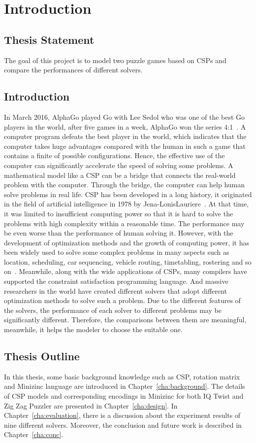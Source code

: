 \chapter{Introduction}
\label{cha:intro}
\section{Thesis Statement}
\label{sec:problemstatement}
The goal of this project is to model two puzzle games based on CSPs and compare the performances of different solvers.
\section{Introduction}
\label{sec:introduction}
In March 2016, AlphaGo played Go with Lee Sedol who was one of the best Go players in the world, after five games in a week, AlphaGo won the series 4:1~\cite{r26}. A computer program defeats the best player in the world, which indicates that the computer takes huge advantages compared with the human in such a game that contains a finite of possible configurations. Hence, the effective use of the computer can significantly accelerate the speed of solving some problems. A mathematical model like a CSP can be a bridge that connects the real-world problem with the computer. Through the bridge, the computer can help human solve problems in real life. CSP has been developed in a long history, it originated in the field of artificial intelligence in 1978 by Jena-LonisLauriere~\cite{r27}. At that time, it was limited to insufficient computing power so that it is hard to solve the problems with high complexity within a reasonable time. The performance may be even worse than the performance of human solving it. However, with the development of optimization methods and the growth of computing power, it has been widely used to solve some complex problems in many aspects such as location, scheduling, car sequencing, vehicle routing, timetabling, rostering and so on~\cite{r28}. Meanwhile, along with the wide applications of CSPs, many compilers have supported the constraint satisfaction programming language. And massive researchers in the world have created different solvers that adopt different optimization methods to solve such a problem. Due to the different features of the solvers, the performance of each solver to different problems may be significantly different. Therefore, the comparisons between them are meaningful, meanwhile, it helps the modeler to choose the suitable one.
\section{Thesis Outline}
\label{sec:outline}
In this thesis, some basic background knowledge such as CSP, rotation matrix and Minizinc language are introduced in Chapter~\ref{cha:background}. The details of CSP models and corresponding encodings in Minizinc for both IQ Twist and Zig Zag Puzzler are presented in Chapter~\ref{cha:design}. In Chapter~\ref{cha:evaluation}, there is a discussion about the experiment results of nine different solvers. Moreover, the conclusion and future work is described in Chapter~\ref{cha:conc}.
